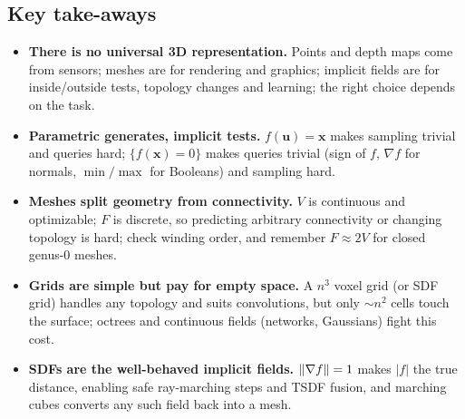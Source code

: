 \documentclass[11pt,a4paper]{article}
\newcommand{\Surf}{\mathcal{S}}
\newcommand{\vx}{\bm{x}}
\newcommand{\vu}{\bm{u}}
\theoremstyle{definition}
\newtheorem{definition}{Definition}[section]
\theoremstyle{plain}
\theoremstyle{remark}
\begin{document}
\subsection*{Key take-aways}
\begin{itemize}
\item \textbf{There is no universal 3D representation.} Points and depth maps come from sensors; meshes are for rendering and graphics; implicit fields are for inside/outside tests, topology changes and learning; the right choice depends on the task.
\item \textbf{Parametric generates, implicit tests.} $f(\vu)=\vx$ makes sampling trivial and queries hard; $\{f(\vx)=0\}$ makes queries trivial (sign of $f$, $\nabla f$ for normals, $\min/\max$ for Booleans) and sampling hard.
\item \textbf{Meshes split geometry from connectivity.} $V$ is continuous and optimizable; $F$ is discrete, so predicting arbitrary connectivity or changing topology is hard; check winding order, and remember $F\approx2V$ for closed genus-0 meshes.
\item \textbf{Grids are simple but pay for empty space.} A $n^3$ voxel grid (or SDF grid) handles any topology and suits convolutions, but only $\sim n^2$ cells touch the surface; octrees and continuous fields (networks, Gaussians) fight this cost.
\item \textbf{SDFs are the well-behaved implicit fields.} $\lVert \nabla f\rVert=1$ makes $|f|$ the true distance, enabling safe ray-marching steps and TSDF fusion, and marching cubes converts any such field back into a mesh.
\end{itemize}


\end{document}
